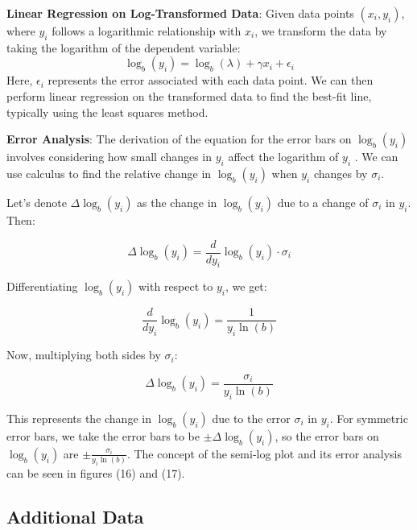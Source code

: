 \documentclass{article}
\begin{document}
\textbf{Linear Regression on Log-Transformed Data}:
Given data points $(x_i, y_i)$, where $y_i$ follows a logarithmic relationship with $x_i$, we transform the data by taking the logarithm of the dependent variable:
     \[ \log_b(y_i) = \log_b(\lambda) + \gamma x_i + \epsilon_i \]
Here, $\epsilon_i$ represents the error associated with each data point. We can then perform linear regression on the transformed data to find the best-fit line, typically using the least squares method.

\textbf{Error Analysis}:
The derivation of the equation for the error bars on $\log_b(y_i)$ involves considering how small changes in $y_i$ affect the logarithm of $y_i$ \cite{stewart2010calculus}\cite{taylor2022introduction}\cite{press2007numerical}. We can use calculus to find the relative change in $\log_b(y_i)$ when $y_i$ changes by $\sigma_i$.

Let's denote $\Delta \log_b(y_i)$ as the change in $\log_b(y_i)$ due to a change of $\sigma_i$ in $y_i$. Then:

\[
\Delta \log_b(y_i) = \frac{d}{dy_i} \log_b(y_i) \cdot \sigma_i
\]

Differentiating $\log_b(y_i)$ with respect to $y_i$, we get:

\[
\frac{d}{dy_i} \log_b(y_i) = \frac{1}{y_i \ln(b)}
\]

Now, multiplying both sides by $\sigma_i$:

\[
\Delta \log_b(y_i) = \frac{\sigma_i}{y_i \ln(b)}
\]

This represents the change in $\log_b(y_i)$ due to the error $\sigma_i$ in $y_i$. For symmetric error bars, we take the error bars to be $\pm \Delta \log_b(y_i)$, so the error bars on $\log_b(y_i)$ are $\pm \frac{\sigma_i}{{y_i \ln(b)}}$\cite{bevington2003data,press2007numerical,taylor2022introduction}. The concept of the semi-log plot and its error analysis can be seen in figures (16) and (17).


\subsection{Additional Data}
\label{subsec:data}




\end{document}
